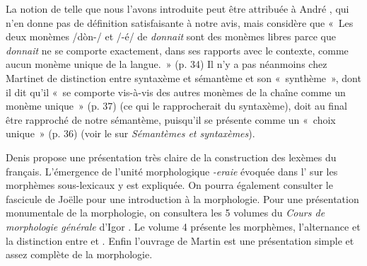 {    La notion de  telle que nous l’avons introduite peut être attribuée à André \citet{martinet1985syntaxe}, qui n’en donne pas de définition satisfaisante à notre avis, mais considère que «~Les deux monèmes /dòn-/ et /-é/ de \textit{donnait} sont des monèmes libres parce que \textit{donnait} ne se comporte exactement, dans ses rapports avec le contexte, comme aucun monème unique de la langue.~» (p. 34) Il n’y a pas néanmoins chez Martinet de distinction entre syntaxème et sémantème et son «~synthème~», dont il dit qu’il «~se comporte vis-à-vis des autres monèmes de la chaîne comme un monème unique~» (p. 37) (ce qui le rapprocherait du syntaxème), doit au final être rapproché de notre sémantème, puisqu’il se présente comme un «~choix unique~» (p. 36) (voir le  sur \textit{Sémantèmes et syntaxèmes}).

    Denis \citet{apotheloz2002construction} propose une présentation très claire de la construction des lexèmes du français. L’émergence de l'unité morphologique \textit{{}-eraie} évoquée dans l' sur les morphèmes sous-lexicaux y est expliquée. On pourra également consulter le fascicule de Joëlle \citet{gardes-tamine1990grammaire} pour une introduction à la morphologie. Pour une présentation monumentale de la morphologie, on consultera les 5 volumes du \textit{Cours de morphologie générale} d’Igor \citet{melcuk1993cours}. Le volume 4 présente les morphèmes, l’alternance et la distinction entre  et . Enfin l'ouvrage de Martin \citet{haspelmath2013understanding} est une présentation simple et assez complète de la morphologie.

}
